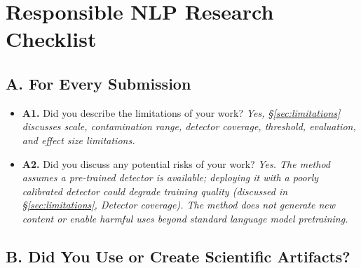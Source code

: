 
\section*{Responsible NLP Research Checklist}

\subsection*{A. For Every Submission}

\begin{itemize}[nosep,leftmargin=*]
\item[\checkmark] \textbf{A1.} Did you describe the limitations of your work?
\textit{Yes, \S\ref{sec:limitations} discusses scale, contamination range, detector coverage, threshold, evaluation, and effect size limitations.}

\item[\checkmark] \textbf{A2.} Did you discuss any potential risks of your work?
\textit{Yes. The method assumes a pre-trained detector is available; deploying it with a poorly calibrated detector could degrade training quality (discussed in \S\ref{sec:limitations}, Detector coverage). The method does not generate new content or enable harmful uses beyond standard language model pretraining.}
\end{itemize}

\subsection*{B. Did You Use or Create Scientific Artifacts?}

